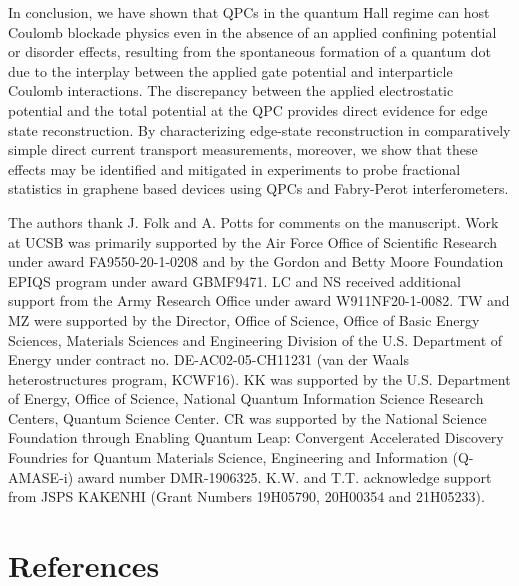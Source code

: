 \documentclass[reprint,prl,aps,superscriptaddress]{revtex4-1}
\begin{document}
In conclusion, we have shown that QPCs in the quantum Hall regime can host Coulomb blockade physics even in the absence of an applied confining potential or disorder effects, resulting from the spontaneous formation of a quantum dot due to the interplay between the applied gate potential and interparticle  Coulomb interactions.  The discrepancy between the applied electrostatic potential and the total potential at the QPC provides direct evidence for edge state reconstruction.  By characterizing edge-state reconstruction in comparatively simple direct current transport measurements, moreover, we show that these effects may be identified and mitigated in experiments to probe fractional statistics in graphene based devices using QPCs\cite{zimmermann_tunable_2017,
cohen_nanoscale_2023,cohen_universal_2023} and Fabry-Perot interferometers\cite{ronen_aharonov-bohm_2021,deprez_tunable_2021,fu_aharonov-bohm_2023,werkmeister_strongly_2023,zhao_graphene-based_2022}. 

\begin{acknowledgments}
The authors thank J. Folk and A. Potts for comments on the manuscript.  
Work at UCSB was primarily supported by the Air Force Office of Scientific Research under award FA9550-20-1-0208 and by the Gordon and Betty Moore Foundation EPIQS program under award GBMF9471. 
LC and NS received additional support from the Army Research Office under award W911NF20-1-0082. 
TW and MZ were supported by the Director, Office of Science, Office of Basic Energy Sciences, Materials Sciences and Engineering Division of the U.S. Department of Energy under contract no. DE-AC02-05-CH11231 (van der Waals heterostructures program, KCWF16).
KK was supported by the U.S. Department of Energy, Office of Science, National Quantum Information Science Research Centers, Quantum Science Center. 
CR was supported by the National Science Foundation through Enabling Quantum Leap: Convergent Accelerated Discovery Foundries for Quantum Materials Science, Engineering and Information (Q-AMASE-i) award number DMR-1906325. 
K.W. and T.T. acknowledge support from JSPS KAKENHI (Grant Numbers 19H05790, 20H00354 and 21H05233).
\end{acknowledgments}

\normalem
\section{References}


\newpage
\clearpage

\renewcommand\thefigure{S\arabic{figure}}
\setcounter{figure}{0}
\end{document}
